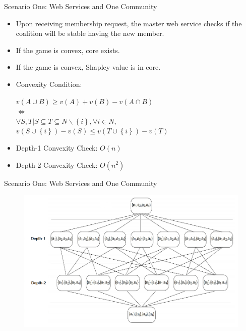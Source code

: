 \documentclass{beamer}
\begin{document}
\begin{frame}{Scenario One: Web Services and One Community}


    \begin{itemize}
        \item Upon receiving membership request, the master web service checks if the coalition will be stable having the new member.
        \item If the game is convex, core exists.
        \item If the game is convex, Shapley value is in core.
        \item Convexity Condition:
        \begin{center}
          $v(A \cup B) \geq v(A) + v(B) - v(A \cap B)$ \\
          $\Leftrightarrow$  \\
          $\forall S,T | S \subseteq T \subseteq N \backslash \left\{i\right\}, \forall i \in N,$ \\
          {\color{blue} $v(S \cup \left\{i\right\}) - v(S) \leq v (T \cup \left\{i\right\}) - v(T)$ }
        \end{center}
        \item Depth-1 Convexity Check: $O(n)$
        \item Depth-2 Convexity Check: $O(n^2)$
    \end{itemize}
       	
\end{frame}

\begin{frame}{Scenario One: Web Services and One Community}

    \begin{figure}[htbp]
        \centering
        \includegraphics[width=0.92 \columnwidth]{figures/dp.png}
    \end{figure}

       	
\end{frame}
\end{document}
